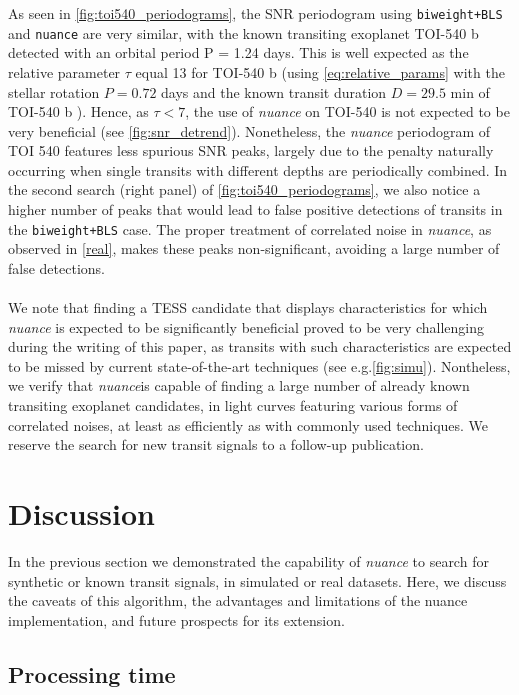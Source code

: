 \documentclass[modern]{aastex631}
\newcommand{\nuancemethod}{\textit{nuance}}
\newcommand{\nuance}{\nuancemethod{}}
\newcommand{\nuancecode}{\textsf{nuance}}
\begin{document}
As seen in \autoref{fig:toi540_periodograms}, the SNR periodogram using \texttt{biweight+BLS} and \texttt{nuance} are very similar, with the known transiting exoplanet TOI-540 b detected with an orbital period P = 1.24 days. This is well expected as the relative parameter $\tau$ equal 13 for TOI-540 b (using \autoref{eq:relative_params} with the stellar rotation $P=0.72$ days and the known transit duration $D=29.5$ min of TOI-540 b \citep{TOI540}). Hence, as $\tau < 7$, the use of \nuance{} on TOI-540 is not expected to be very beneficial (see \autoref{fig:snr_detrend}). Nonetheless, the \nuance{} periodogram of TOI 540 features less spurious SNR peaks, largely due to the penalty naturally occurring when single transits with different depths are periodically combined. In the second search (right panel) of \autoref{fig:toi540_periodograms}, we also notice a higher number of peaks that would lead to false positive detections of transits in the \texttt{biweight+BLS} case. The proper treatment of correlated noise in \nuance{}, as observed in \autoref{real}, makes these peaks non-significant, avoiding a large number of false detections.\\\\
We note that finding a TESS candidate that displays characteristics for which \nuance{} is expected to be significantly beneficial proved to be very challenging during the writing of this paper, as transits with such characteristics are expected to be missed by current state-of-the-art techniques (see e.g.\;\autoref{fig:simu}). Nontheless, we verify that \nuancemethod is capable of finding a large number of already known transiting exoplanet candidates, in light curves featuring various forms of correlated noises, at least as efficiently as with commonly used techniques. We reserve the search for new transit signals to a follow-up publication.

\section{Discussion}\label{discussion}

In the previous section we demonstrated the capability of \nuance{} to search for synthetic or known transit signals, in simulated or real datasets. Here, we discuss the caveats of this algorithm, the advantages and limitations of the \nuancecode{} implementation, and future prospects for its extension.

\subsection{Processing time}
\end{document}
